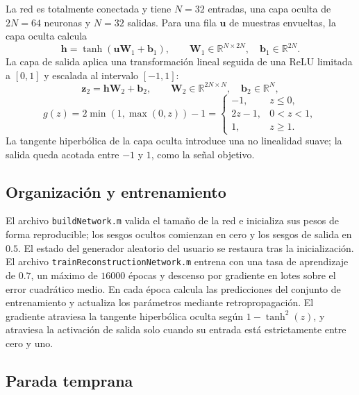 \documentclass[12pt,a4paper]{article}
\begin{document}
La red es totalmente conectada y tiene \(N=32\) entradas, una capa oculta de \(2N=64\) neuronas y \(N=32\) salidas. Para una fila \(\mathbf{u}\) de muestras envueltas, la capa oculta calcula
\begin{equation*}
  \mathbf{h}=\tanh\!\left(\mathbf{u}\mathbf{W}_1+\mathbf{b}_1\right),
  \qquad \mathbf{W}_1\in\mathbb{R}^{N\times 2N},
  \quad \mathbf{b}_1\in\mathbb{R}^{2N}.
\end{equation*}
La capa de salida aplica una transformación lineal seguida de una ReLU limitada a \([0,1]\) y escalada al intervalo \([-1,1]\):
\begin{equation*}
  \mathbf{z}_2=\mathbf{h}\mathbf{W}_2+\mathbf{b}_2,
  \qquad \mathbf{W}_2\in\mathbb{R}^{2N\times N},
  \quad \mathbf{b}_2\in\mathbb{R}^{N},
\end{equation*}
\begin{equation*}
  g(z)=2\min\!\left(1,\max(0,z)\right)-1
  =\begin{cases}
    -1, & z\leq 0,\\
    2z-1, & 0<z<1,\\
    1, & z\geq 1.
  \end{cases}
\end{equation*}
La tangente hiperbólica de la capa oculta introduce una no linealidad suave; la salida queda acotada entre \(-1\) y \(1\), como la señal objetivo.

\subsection{Organización y entrenamiento}

El archivo \texttt{buildNetwork.m} valida el tamaño de la red e inicializa sus pesos de forma reproducible; los sesgos ocultos comienzan en cero y los sesgos de salida en \(0.5\). El estado del generador aleatorio del usuario se restaura tras la inicialización. El archivo \texttt{trainReconstructionNetwork.m} entrena con una tasa de aprendizaje de \(0.7\), un máximo de \(16000\) épocas y descenso por gradiente en lotes sobre el error cuadrático medio. En cada época calcula las predicciones del conjunto de entrenamiento y actualiza los parámetros mediante retropropagación. El gradiente atraviesa la tangente hiperbólica oculta según \(1-\tanh^2(z)\), y atraviesa la activación de salida solo cuando su entrada está estrictamente entre cero y uno.

\subsection{Parada temprana}
\end{document}
